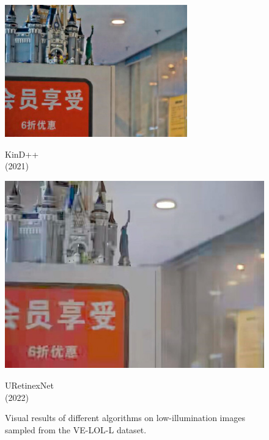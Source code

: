 \documentclass[CJK,aspectratio=169]{beamer}  %
\begin{document}
\begin{frame}
\begin{figure}
\begin{minipage}{.58\columnwidth}
\begin{minipage}{0.17\columnwidth}
					\includegraphics[width=\linewidth]{picture/LLIE/VE-LOL-L/KinD++}
					\caption*{\tiny KinD++ \\ (2021)}
					\label{fig: KinD++}	
				\end{minipage}
				\begin{minipage}{0.17\columnwidth}
					\includegraphics[width=\linewidth]{picture/LLIE/VE-LOL-L/URetinexNet}
					\caption*{\tiny URetinexNet \\ (2022)}
					\label{fig: URetinexNet}	
				\end{minipage}
				
				\caption{
					\label{fig: VE-LOL-L Visual} 
					\tiny Visual results of different algorithms on low-illumination images sampled from the VE-LOL-L dataset.
				}
			\end{minipage}
		\end{figure}
	\end{frame}
	
\end{document}
